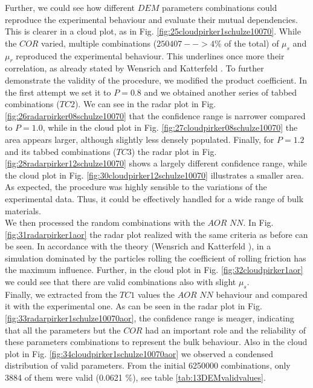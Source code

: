 Further, we could see how different $DEM$ parameters
combinations could reproduce the experimental behaviour and evaluate their mutual dependencies. 
This is clearer in a cloud plot, as in Fig. 
\ref{fig:25cloudpirker1schulze10070}. While the $COR$ varied, multiple
combinations ($250407 --> 4\% $ of the total) of $\mu_s$ and $\mu_r$ reproduced
the experimental behaviour.
This underlines once more their correlation, as already stated by Wensrich and 
Katterfeld \cite{RefWorks:87}.
To further demonstrate the validity of the procedure, we modified the product
coefficient. In the first attempt we set it to $P=0.8$ and we obtained another
series of tabbed combinations ($TC2$).
We can see in the radar plot in Fig.
\ref{fig:26radarpirker08schulze10070} that the confidence range is narrower
compared to $P=1.0$, while in the cloud plot in Fig. 
\ref{fig:27cloudpirker08schulze10070} the area
appears larger, although slightly less densely populated. Finally, for $P=1.2$
and its tabbed combinations ($TC3$) the radar plot in Fig.
\ref{fig:28radarpirker12schulze10070} shows a largely different confidence
range, while the cloud plot in Fig. \ref{fig:30cloudpirker12schulze10070} 
illustrates a smaller area. As expected, the procedure was highly sensible to the variations of the experimental data. 
Thus, it could be effectively handled for a wide range of bulk materials.\\
% 
We then processed the random combinations with the $AOR$ $NN$. In Fig.
\ref{fig:31radarpirker1aor} the radar plot realized with the same criteria as
before can be seen.
In accordance with the theory (Wensrich and Katterfeld \cite{RefWorks:87}), in a simulation dominated
by the particles rolling the coefficient of rolling friction has the maximum influence. 
Further, in the cloud plot in Fig. \ref{fig:32cloudpirker1aor}
we could see that there are valid combinations also with slight $\mu_s$. \\
Finally, we extracted from the $TC1$ values the $AOR$ $NN$ behaviour
and compared it with the experimental one.
As can be seen in the radar plot in Fig.
\ref{fig:33radarpirker1schulze10070aor}, the confidence range is meager, indicating that all the parameters but the $COR$ 
had an important role and the reliability of these parameters combinations to represent the bulk behaviour. 
Also in the cloud plot in Fig. \ref{fig:34cloudpirker1schulze10070aor} we
observed a condensed distribution of valid parameters.
From the initial 6250000 combinations, only 3884 of them were valid (0.0621 \%),
see table \ref{tab:13DEMvalidvalues}.



%
%
%


